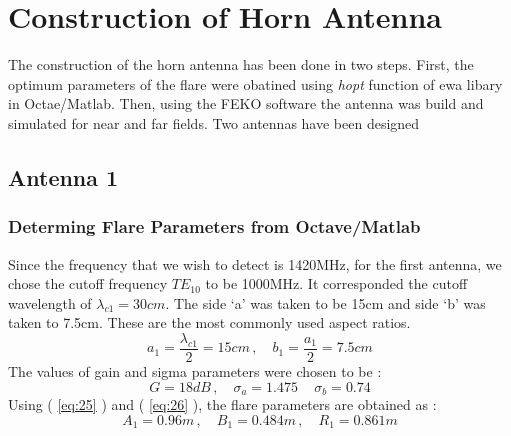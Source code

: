 \documentclass[12pt]{article}
\newcommand*{\myref}[1]{%
  \begingroup
    \hypersetup{
      linkcolor=linkequation,
      linkbordercolor=linkequation,
    }%
    \ref{#1}%
  \endgroup
}
\begin{document}
\section{Construction of Horn Antenna}
The construction of the horn antenna has been done in two steps. First, the optimum parameters of the flare were obatined using \textit{hopt} function of ewa libary in Octae/Matlab. Then, using the FEKO software the antenna was build and simulated for near and far fields. \linebreak
Two antennas have been designed
\subsection{Antenna 1} %
\subsubsection{Determing Flare Parameters from Octave/Matlab}
Since the frequency that we wish to detect is 1420MHz, for the first antenna, we chose the cutoff frequency $TE_{10}$ to be 1000MHz. It corresponded the cutoff wavelength of $\lambda_{c1}=30cm$. \linebreak
The side `a' was taken to be 15cm and side `b' was taken to 7.5cm. These are the most commonly used aspect ratios.
\begin{equation}
  a_1=\dfrac{\lambda_{c1}}{2}=15cm \, , \quad b_1=\dfrac{a_1}{2}=7.5cm \label{eq:25}
\end{equation}
The values of gain and sigma parameters were chosen to be :
\begin{equation}
  G=18dB\, , \quad \sigma_a=1.475 \, \quad \sigma_b=0.74 \label{eq:26}
\end{equation}
Using (\myref{eq:25}) and (\myref{eq:26}), the flare parameters are obtained as :
\begin{equation}
  A_1=0.96m \, , \quad B_1=0.484m \, , \quad R_1=0.861m \label{eq:27}
\end{equation}
\end{document}
